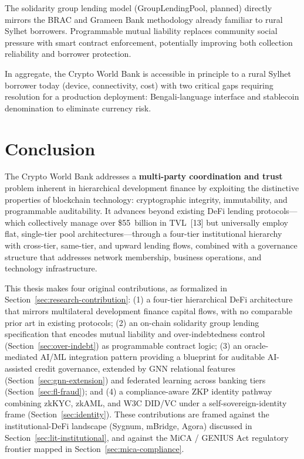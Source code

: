 \documentclass[12pt,a4paper]{report}
\begin{document}
\begin{description}[leftmargin=0pt]
\item[\textbf{6. Group lending fit.}] The solidarity group lending model (GroupLendingPool, planned) directly mirrors the BRAC and Grameen Bank methodology already familiar to rural Sylhet borrowers. Programmable mutual liability replaces community social pressure with smart contract enforcement, potentially improving both collection reliability and borrower protection.

\end{description}

In aggregate, the Crypto World Bank is accessible in principle to a rural Sylhet borrower today (device, connectivity, cost) with two critical gaps requiring resolution for a production deployment: Bengali-language interface and stablecoin denomination to eliminate currency risk.


\chapter{Conclusion}

The Crypto World Bank addresses a \textbf{multi-party coordination and trust} problem inherent in hierarchical development finance by exploiting the distinctive properties of blockchain technology: cryptographic integrity, immutability, and programmable auditability. It advances beyond existing DeFi lending protocols---which collectively manage over \$55~billion in TVL~[13] but universally employ flat, single-tier pool architectures---through a four-tier institutional hierarchy with cross-tier, same-tier, and upward lending flows, combined with a governance structure that addresses network membership, business operations, and technology infrastructure.

This thesis makes four original contributions, as formalized in Section~\ref{sec:research-contribution}: (1) a four-tier hierarchical DeFi architecture that mirrors multilateral development finance capital flows, with no comparable prior art in existing protocols; (2) an on-chain solidarity group lending specification that encodes mutual liability and over-indebtedness control (Section~\ref{sec:over-indebt}) as programmable contract logic; (3) an oracle-mediated AI/ML integration pattern providing a blueprint for auditable AI-assisted credit governance, extended by GNN relational features (Section~\ref{sec:gnn-extension}) and federated learning across banking tiers (Section~\ref{sec:fl-fraud}); and (4) a compliance-aware ZKP identity pathway combining zkKYC, zkAML, and W3C DID/VC under a self-sovereign-identity frame (Section~\ref{sec:identity}). These contributions are framed against the institutional-DeFi landscape (Sygnum, mBridge, Agora) discussed in Section~\ref{sec:lit-institutional}, and against the MiCA / GENIUS Act regulatory frontier mapped in Section~\ref{sec:mica-compliance}.
\end{document}
